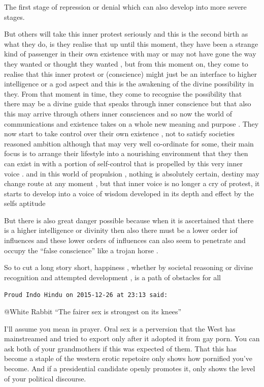 \begin{footnotesize}
\begin{sffamily}
The first stage of repression or denial which can also develop into more severe stages.

But others will take this inner protest seriously and this is the second birth as what they do, is they realise that up until this moment, they have been a strange kind of passenger in their own existence with may or may not have gone the way they wanted or thought they wanted , but from this moment on, they come to realise that this inner protest or (conscience) might just be an interface to higher intelligence or a god aspect and this is the awakening of the divine possibility in they. From that moment in time, they come to recognise the possibility that there may be a divine guide that speaks through inner conscience but that also this may arrive through others inner consciences and so now the world of communications and existence takes on a whole new meaning and purpose . They now start to take control over their own existence , not to satisfy societies reasoned ambition although that may very well co-ordinate for some, their main focus is to arrange their lifestyle into a nourishing environment that they then can exist in with a portion of self-control that is propelled by this very inner voice . and in this world of propulsion , nothing is absolutely certain, destiny may change route at any moment , but that inner voice is no longer a cry of protest, it starts to develop into a voice of wisdom developed in its depth and effect by the selfs aptitude

But there is also great danger possible because when it is ascertained that there is a higher intelligence or divinity then also there must be a lower order iof influences and these lower orders of influences can also seem to penetrate and occupy the ``false conscience'' like a trojan horse .

So to cut a long story short, happiness , whether by societal reasoning or divine recognition and attempted development , is a path of obstacles for all

\hfill

\texttt{Proud Indo Hindu on 2015-12-26 at 23:13 said:}

@White Rabbit ``The fairer sex is strongest on its knees''

I'll assume you mean in prayer. Oral sex is a perversion that the West has mainstreamed and tried to export only after it adopted it from gay porn. You can ask both of your grandmothers if this was expected of them. That this has become a staple of the western erotic repetoire only shows how pornified you've become. And if a presidential candidate openly promotes it, only shows the level of your political discourse.


\end{sffamily}
\end{footnotesize}
